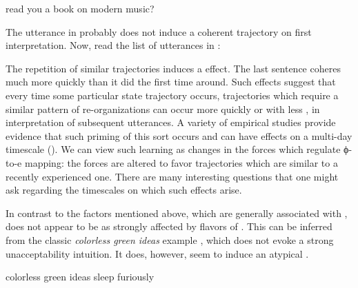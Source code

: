   \ea\label{ex:6:19}
    {read you a book on modern music?}
\z

The utterance in  probably does not induce a coherent trajectory on first interpretation. Now, read the list of utterances in :

\ea\label{ex:6:20}
\z
\z

  The repetition of similar trajectories induces a  effect. The last sentence coheres much more quickly than it did the first time around. Such effects suggest that every time some particular state trajectory occurs, trajectories which require a similar pattern of re-or\-ga\-ni\-za\-tions can occur more quickly or with less , in interpretation of subsequent utterances. A variety of empirical studies provide evidence that such priming of this sort occurs and can have effects on a multi-day timescale (\citealt{BockEtAl2007,VSFerreiraEtAl2006,Nagata1988,Nagata1992,PickeringFerreira2008,RowlandEtAl2012}). We can view such learning as  changes in the forces which regulate ϕ-to-e mapping: the forces are altered to favor trajectories which are similar to a recently experienced one. There are many interesting questions that one might ask regarding the timescales on which such effects arise.

In contrast to the factors mentioned above, which are generally associated with ,  does not appear to be as strongly affected by flavors of . This can be inferred from the classic \textit{colorless green ideas} example \citep{Chomsky1956}, which does not evoke a strong unacceptability intuition. It does, however, seem to induce an atypical .
 
\ea
colorless green ideas sleep furiously
\z 

